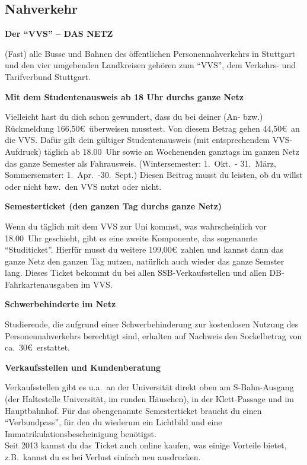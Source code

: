 \subsection{Nahverkehr}

{\large \bf Der "`VVS"' -- DAS NETZ}

(Fast) alle Busse und Bahnen des öffentlichen Personennahverkehrs
in Stuttgart und den vier umgebenden Landkreisen
gehören zum "`VVS"', dem Verkehrs- und Tarifverbund Stuttgart.

{\large \bf Mit dem Studentenausweis ab 18 Uhr durchs ganze Netz}

Vielleicht hast du dich schon gewundert,
dass du bei deiner (An- bzw.) Rückmeldung 166,50\euro\ überweisen musstest.
Von diesem Betrag gehen 44,50\euro\ an die VVS.
Dafür gilt dein gültiger Studentenausweis
(mit entsprechendem VVS-Aufdruck) täglich ab 18.00~Uhr
sowie an Wochenenden ganztags im ganzen Netz
das ganze Semester als Fahrausweis.
(Wintersemester: 1.~Okt.~- 31.~März, Sommersemster: 1.~Apr.~-30.~Sept.)
Diesen Beitrag musst du leisten,
ob du willst oder nicht bzw.~den VVS nutzt oder nicht.

{\large \bf Semesterticket (den ganzen Tag durchs ganze Netz)}

Wenn du täglich mit dem VVS zur Uni kommst,
was wahrscheinlich vor 18.00~Uhr geschieht,
gibt es eine zweite Komponente, das sogenannte "`Studiticket"'.
Hierfür musst du weitere 199,00\euro\ zahlen
und kannst dann das ganze Netz den ganzen Tag nutzen,
natürlich auch wieder das ganze Semster lang.
Dieses Ticket bekommt du bei allen SSB-Verkaufsstellen
und allen DB-Fahrkartenausgaben im VVS. 

{\large \bf Schwerbehinderte im Netz}

Studierende, die aufgrund einer Schwerbehinderung
zur kostenlosen Nutzung des Personennahverkehrs berechtigt sind,
erhalten auf Nachweis den Sockelbetrag von ca.\ 30\euro\ erstattet.

{\large \bf Verkaufsstellen und Kundenberatung}

Verkaufsstellen gibt es u.a.\ 
an der Universität direkt oben am S-Bahn-Ausgang
(der Haltestelle \glqq Universität\grqq, im runden Häuschen),
in der Klett-Passage und im Hauptbahnhof.
Für das obengenannte Semesterticket braucht du einen "`Verbundpass"',
für den du wiederum ein Lichtbild und eine
Immatrikulationsbescheinigung benötigst.\\
Seit 2013 kannst du das Ticket auch online kaufen,
was einige Vorteile bietet,
z.B.\ kannst du es bei Verlust einfach neu ausdrucken.\\[1cm]

